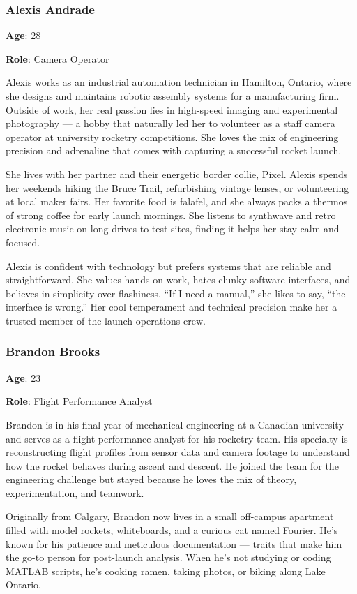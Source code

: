\documentclass[12pt]{article}
\begin{document}
\subsubsection*{Alexis Andrade}

\textbf{Age}: 28

\textbf{Role}: Camera Operator

Alexis works as an industrial automation technician in Hamilton, Ontario, where
she designs and maintains robotic assembly systems for a manufacturing firm.
Outside of work, her real passion lies in high-speed imaging and experimental
photography — a hobby that naturally led her to volunteer as a staff camera
operator at university rocketry competitions. She loves the mix of engineering
precision and adrenaline that comes with capturing a successful rocket launch.

She lives with her partner and their energetic border collie, Pixel. Alexis
spends her weekends hiking the Bruce Trail, refurbishing vintage lenses, or
volunteering at local maker fairs. Her favorite food is falafel, and she always
packs a thermos of strong coffee for early launch mornings. She listens to
synthwave and retro electronic music on long drives to test sites, finding it
helps her stay calm and focused.

Alexis is confident with technology but prefers systems that are reliable and
straightforward. She values hands-on work, hates clunky software interfaces,
and believes in simplicity over flashiness. “If I need a manual,” she likes to
say, “the interface is wrong.” Her cool temperament and technical precision
make her a trusted member of the launch operations crew.

\subsubsection*{Brandon Brooks}

\textbf{Age}: 23

\textbf{Role}: Flight Performance Analyst

Brandon is in his final year of mechanical engineering at a Canadian university
and serves as a flight performance analyst for his rocketry team. His specialty
is reconstructing flight profiles from sensor data and camera footage to
understand how the rocket behaves during ascent and descent. He joined the team
for the engineering challenge but stayed because he loves the mix of theory,
experimentation, and teamwork.

Originally from Calgary, Brandon now lives in a small off-campus apartment
filled with model rockets, whiteboards, and a curious cat named Fourier. He's
known for his patience and meticulous documentation — traits that make him the
go-to person for post-launch analysis. When he's not studying or coding MATLAB
scripts, he's cooking ramen, taking photos, or biking along Lake Ontario.
\end{document}
